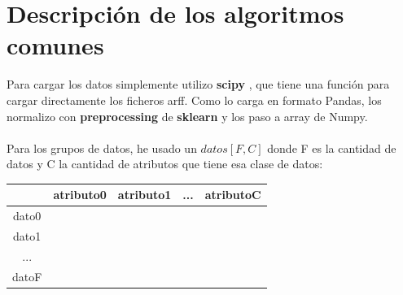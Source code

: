\documentclass[12pt,a4paper]{article}
\begin{document}
\section{Descripción de los algoritmos comunes}
Para cargar los datos simplemente utilizo \textbf{scipy} \cite{spiz}, que tiene una función para cargar directamente los ficheros arff. Como lo carga en formato Pandas, los normalizo con \textbf{preprocessing}   de \textbf{sklearn} \cite{Baz}
 y los paso a array de Numpy. \\\\
Para los grupos de datos, he usado un $datos[F,C]$ donde F es la cantidad de datos y C la cantidad de atributos que tiene esa clase de datos:
\begin{table}[H]
	\centering
	\begin{tabular}{|c|c|c|c|c|}
		\hline 
			\backslashbox{Datos}{Atributos}& atributo0 & atributo1 & ... & atributoC \\ 
		\hline 
		dato0 &  &  &  &  \\ 
		\hline 
		dato1 &  &  &  &  \\ 
		\hline 
		... &  &  &  &  \\ 
		\hline 
		datoF &  &  &  &  \\ 
		\hline 
	\end{tabular} 
\end{table}
\end{document}
